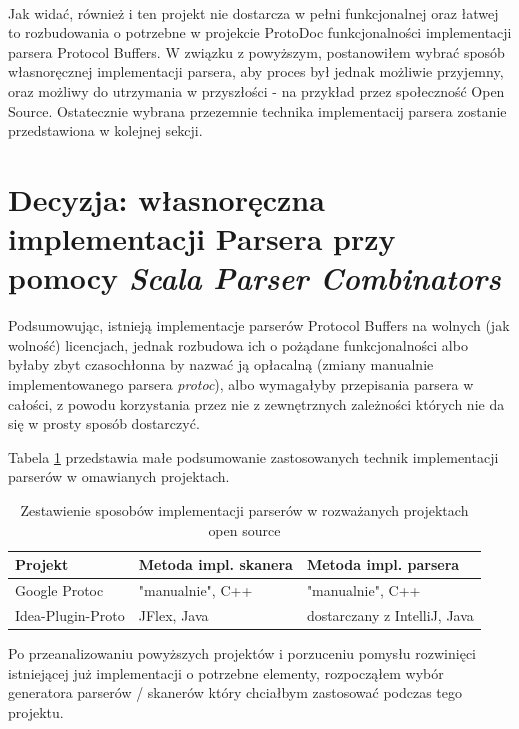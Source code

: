 \documentclass[pdflatex,11pt]{aghdpl}
\begin{document}
~\\\*

Jak widać, również i ten projekt nie dostarcza w pełni funkcjonalnej oraz łatwej to rozbudowania o potrzebne w projekcie ProtoDoc funkcjonalności implementacji parsera
Protocol Buffers. W związku z powyższym, postanowiłem wybrać sposób własnoręcznej implementacji parsera, aby proces był jednak możliwie przyjemny, oraz
możliwy do utrzymania w przyszłości - na przykład przez społeczność Open Source. Ostatecznie wybrana przezemnie technika implementacij parsera 
zostanie przedstawiona w kolejnej sekcji.



\section{Decyzja: własnoręczna implementacji Parsera przy pomocy \textit{Scala Parser Combinators}}
\label{sec:wybor_parsera}

Podsumowując, istnieją implementacje parserów Protocol Buffers na wolnych (jak wolność) licencjach, jednak rozbudowa ich o pożądane funkcjonalności 
albo byłaby zbyt czasochłonna by nazwać ją opłacalną (zmiany manualnie implementowanego parsera \textit{protoc}), albo wymagałyby 
przepisania parsera w całości, z powodu korzystania przez nie z zewnętrznych zależności których nie da się w prosty sposób dostarczyć.

Tabela \ref{tab:parers} przedstawia małe podsumowanie zastosowanych technik implementacji parserów w omawianych projektach.

\begin{table}[ch]
  \begin{center}
    \begin{tabular}{| l | l | l |}
      \hline
      Projekt & Metoda impl. skanera & Metoda impl. parsera\\
      \hline
      Google Protoc & "manualnie", C++ & "manualnie", C++\\
      \hline
      Idea-Plugin-Proto & JFlex, Java & dostarczany z IntelliJ, Java\\
      \hline
    \end{tabular}
  \end{center}
  \caption{Zestawienie sposobów implementacji parserów w rozważanych projektach open source}
  \label{tab:parers}
\end{table}

Po przeanalizowaniu powyższych projektów i porzuceniu pomysłu rozwinięci istniejącej już implementacji o potrzebne elementy, rozpocząłem
wybór generatora parserów / skanerów który chciałbym zastosować podczas tego projektu. 
\end{document}
